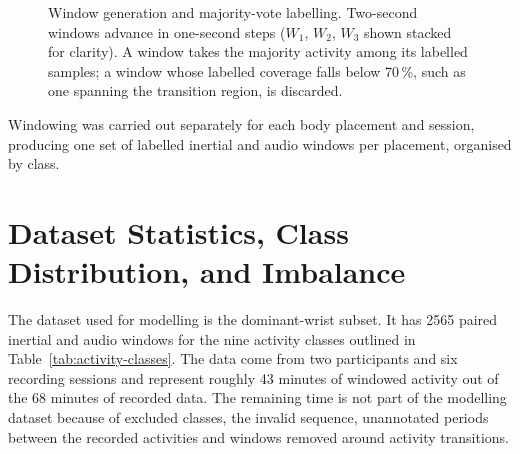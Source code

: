 \begin{figure}[htbp]
\centering
{}
\caption{Window generation and majority-vote labelling. Two-second windows advance
in one-second steps ($W_1$, $W_2$, $W_3$ shown stacked for clarity). A window takes
the majority activity among its labelled samples; a window whose labelled coverage
falls below 70\,\%, such as one spanning the transition region, is discarded.}
\label{fig:windowing}
\end{figure}

Windowing was carried out separately for each body placement and session,
producing one set of labelled inertial and audio windows per placement, organised
by class.

\section{Dataset Statistics, Class Distribution, and Imbalance}
\label{sec:stats}

The dataset used for modelling is the dominant-wrist subset. It has 2565 paired
inertial and audio windows for the nine activity classes outlined in
Table~\ref{tab:activity-classes}. The data come from two participants and six
recording sessions and represent roughly 43 minutes of windowed activity out of
the 68 minutes of recorded data. The remaining time is not part of the modelling
dataset because of excluded classes, the invalid sequence, unannotated periods
between the recorded activities and windows removed around activity transitions.

